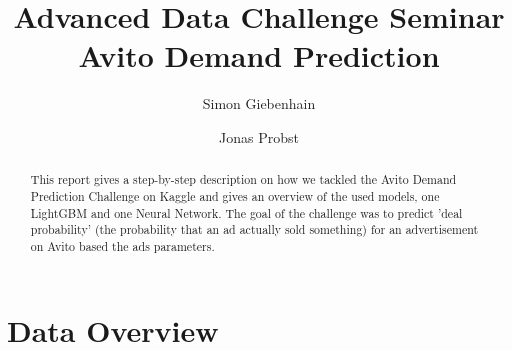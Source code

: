 \documentclass[runningheads]{llncs}
\begin{document}
%
\title{Advanced Data Challenge Seminar\\
		Avito Demand Prediction}
%

%
\author{Simon Giebenhain \and Jonas Probst}
%

%
%
\maketitle              %
%
\begin{abstract}
This report gives a step-by-step description on how we tackled the Avito Demand Prediction Challenge on Kaggle and gives an overview of the used models, one LightGBM and one Neural Network. The goal of the challenge was to predict 'deal probability' (the probability that an ad actually sold something) for an advertisement on Avito based the ads parameters. 

\end{abstract}
%
%
%
	\section{Data Overview}
\end{document}
